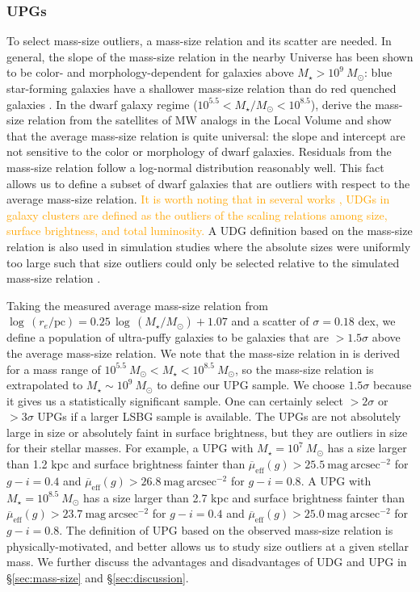 \documentclass[twocolumn,astrosymb,twocolappendix,linenumbers]{aastex631}
\newcommand{\sbunit}{\mathrm{mag\ arcsec}^{-2}}
\newcommand{\sbeff}{\overline{\mu}_{\mathrm{eff}}(g)}
\newcommand{\emphasize}{\textcolor{orange}}
\begin{document}
\begin{CJK*}{UTF8}{gbsn}
\subsubsection{UPGs}
To select mass-size outliers, a mass-size relation and its scatter are needed. In general, the slope of the mass-size relation in the nearby Universe has been shown to be color- and morphology-dependent for galaxies above $M_\star > 10^{9}\ M_\odot$: blue star-forming galaxies have a shallower mass-size relation than do red quenched galaxies \citep[e.g.,][]{Lange2015}. In the dwarf galaxy regime ($10^{5.5} < M_\star/M_\odot < 10^{8.5}$), \citet{ELVES-I} derive the mass-size relation from the satellites of MW analogs in the Local Volume and show that the average mass-size relation is quite universal: the slope and intercept are not sensitive to the color or morphology of dwarf galaxies. Residuals from the mass-size relation follow a log-normal distribution reasonably well. This fact allows us to define a subset of dwarf galaxies that are outliers with respect to the average mass-size relation. \emphasize{It is worth noting that in several works \citep[e.g.,][]{Lim2020,Venhola2022}, UDGs in galaxy clusters are defined as the outliers of the scaling relations among size, surface brightness, and total luminosity.} A UDG definition based on the mass-size relation is also used in simulation studies where the absolute sizes were uniformly too large such that size outliers could only be selected relative to the simulated mass-size relation \citep[e.g.,][]{Benavides2021,Benavides2022}. 

Taking the measured average mass-size relation from \citet{ELVES-I} $\log\, (r_e/\mathrm{pc}) = 0.25\, \log\, (M_\star/M_\odot) + 1.07$ and a scatter of $\sigma=0.18$ dex, we define a population of ultra-puffy galaxies to be galaxies that are $>1.5\sigma$ above the average mass-size relation. We note that the mass-size relation in \citet{ELVES-I} is derived for a mass range of $10^{5.5}\ M_\odot < M_\star < 10^{8.5}\ M_\odot$, so the mass-size relation is extrapolated to $M_\star \sim 10^9\ M_\odot$ to define our UPG sample. We choose $1.5\sigma$ because it gives us a statistically significant sample. One can certainly select $>2\sigma$ or $>3\sigma$ UPGs if a larger LSBG sample is available. The UPGs are not absolutely large in size or absolutely faint in surface brightness, but they are outliers in size for their stellar masses. For example, a UPG with $M_\star = 10^7\ M_\odot$ has a size larger than 1.2 kpc and surface brightness fainter than $\sbeff > 25.5\ \sbunit$ for $g-i=0.4$ and $\sbeff > 26.8\ \sbunit$ for $g-i=0.8$. A UPG with $M_\star = 10^{8.5}\ M_\odot$ has a size larger than 2.7 kpc and surface brightness fainter than $\sbeff > 23.7\ \sbunit$ for $g-i=0.4$ and $\sbeff > 25.0\ \sbunit$ for $g-i=0.8$. The definition of UPG based on the observed mass-size relation is physically-motivated, and better allows us to study size outliers at a given stellar mass. We further discuss the advantages and disadvantages of UDG and UPG in \S\ref{sec:mass-size} and \S\ref{sec:discussion}.


\end{CJK*}
\end{document}
